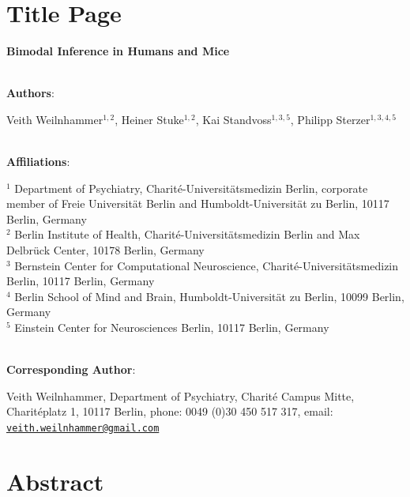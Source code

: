 \documentclass[
]{article}
\author{}
\date{\vspace{-2.5em}}
\begin{document}
\hypertarget{title-page}{%
\section{Title Page}\label{title-page}}

\textbf{Bimodal Inference in Humans and Mice}\\
\strut \\

\textbf{Authors}:

Veith Weilnhammer\(^{1,2}\), Heiner Stuke\(^{1,2}\), Kai
Standvoss\(^{1,3,5}\), Philipp Sterzer\(^{1,3,4,5}\)\\
\strut \\
\textbf{Affiliations}:

\(^{1}\) Department of Psychiatry, Charité-Universitätsmedizin Berlin,
corporate member of Freie Universität Berlin and Humboldt-Universität zu
Berlin, 10117 Berlin, Germany\\
\(^{2}\) Berlin Institute of Health, Charité-Universitätsmedizin Berlin
and Max Delbrück Center, 10178 Berlin, Germany\\
\(^{3}\) Bernstein Center for Computational Neuroscience,
Charité-Universitätsmedizin Berlin, 10117 Berlin, Germany\\
\(^{4}\) Berlin School of Mind and Brain, Humboldt-Universität zu
Berlin, 10099 Berlin, Germany\\
\(^{5}\) Einstein Center for Neurosciences Berlin, 10117 Berlin,
Germany\\
\strut \\

\textbf{Corresponding Author}:

Veith Weilnhammer, Department of Psychiatry, Charité Campus Mitte,
Charitéplatz 1, 10117 Berlin, phone: 0049 (0)30 450 517 317, email:
\href{mailto:veith.weilnhammer@gmail.com}{\nolinkurl{veith.weilnhammer@gmail.com}}\\

\newpage

\linenumbers

\hypertarget{abstract}{%
\section{Abstract}\label{abstract}}
\end{document}
